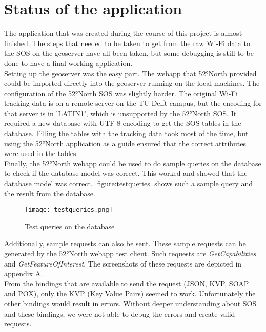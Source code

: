 \chapter{Status of the application}


The application that was created during the course of this project is almost finished. The steps that needed to be taken to get from the raw Wi-Fi data to the SOS on the geoserver have all been taken, but some debugging is still to be done to have a final working application. \\

Setting up the geoserver was the easy part. The webapp that 52°North provided
could be imported directly into the geoserver running on the local machines. The
configuration of the 52°North SOS was slightly harder. The original Wi-Fi
tracking data is on a remote server on the TU Delft campus, but the encoding for
that server is in 'LATIN1', which is unsupported by the 52°North SOS. It required a new database with UTF-8 encoding to get the SOS tables in the database. Filling the tables with the tracking data took most of the time, but using the 52°North application as a guide ensured that the correct attributes were used in the tables. \\

Finally, the 52°North webapp could be used to do sample queries on the database to check if the database model was correct. This worked and showed that the database model was correct. \autoref{figure:testqueries} shows such a sample query and the result from the database. 
\begin{figure}[H]
\centering
\texttt{[image: testqueries.png]}
\captionsetup{justification=centering}
\caption{Test queries on the database}
\label{figure:testqueries}
\end{figure}

Additionally, sample requests can also be sent. These sample requests can be
generated by the 52°North webapp test client. Such requests are
\textit{GetCapabilities} and \textit{GetFeatureOfInterest}. The screenshots of
these requests are depicted in appendix A. \\

From the bindings that are available to send the request (JSON, KVP, SOAP and POX), only the KVP (Key Value Pairs) seemed to work. Unfortunately the other bindings would result in errors. Without deeper understanding about SOS and these bindings, we were not able to debug the errors and create valid requests. 

